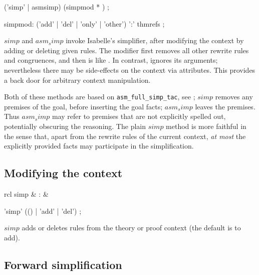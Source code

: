 \begin{rail}
  ('simp' | asmsimp) (simpmod * )
  ;

  simpmod: ('add' | 'del' | 'only' | 'other') ':' thmrefs
  ;
\end{rail}

\begin{descr}
\item [$simp$ and $asm_simp$] invoke Isabelle's simplifier, after modifying
  the context by adding or deleting given rules.  The 
  modifier first removes all other rewrite rules and congruences, and then is
  like .  In contrast,  ignores its arguments;
  nevertheless there may be side-effects on the context via attributes.  This
  provides a back door for arbitrary context manipulation.
  
  Both of these methods are based on \texttt{asm_full_simp_tac}, see
  \cite[\S10]{isabelle-ref}; $simp$ removes any premises of the goal, before
  inserting the goal facts; $asm_simp$ leaves the premises.  Thus $asm_simp$
  may refer to premises that are not explicitly spelled out, potentially
  obscuring the reasoning.  The plain $simp$ method is more faithful in the
  sense that, apart from the rewrite rules of the current context, \emph{at
    most} the explicitly provided facts may participate in the simplification.
\end{descr}

\subsection{Modifying the context}

\begin{matharray}{rcl}
  simp & : & \isaratt \\
\end{matharray}

\begin{rail}
  'simp' (() | 'add' | 'del')
  ;
\end{rail}

\begin{descr}
\item [$simp$] adds or deletes rules from the theory or proof context (the
  default is to add).
\end{descr}


\subsection{Forward simplification}

